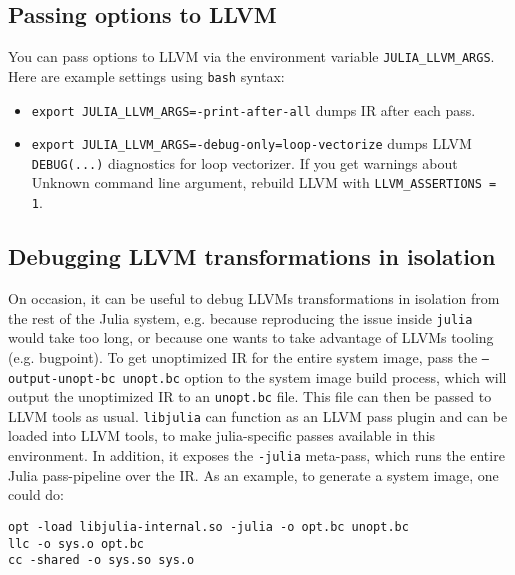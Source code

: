 \hypertarget{3429896864083237221}{}


\subsection{Passing options to LLVM}



You can pass options to LLVM via the environment variable \texttt{JULIA\_LLVM\_ARGS}. Here are example settings using \texttt{bash} syntax:



\begin{itemize}
\item \texttt{export JULIA\_LLVM\_ARGS=-print-after-all} dumps IR after each pass.


\item \texttt{export JULIA\_LLVM\_ARGS=-debug-only=loop-vectorize} dumps LLVM \texttt{DEBUG(...)} diagnostics for loop vectorizer. If you get warnings about {\textquotedbl}Unknown command line argument{\textquotedbl}, rebuild LLVM with \texttt{LLVM\_ASSERTIONS = 1}.

\end{itemize}


\hypertarget{7270369944062365114}{}


\subsection{Debugging LLVM transformations in isolation}



On occasion, it can be useful to debug LLVM{\textquotesingle}s transformations in isolation from the rest of the Julia system, e.g. because reproducing the issue inside \texttt{julia} would take too long, or because one wants to take advantage of LLVM{\textquotesingle}s tooling (e.g. bugpoint). To get unoptimized IR for the entire system image, pass the \texttt{--output-unopt-bc unopt.bc} option to the system image build process, which will output the unoptimized IR to an \texttt{unopt.bc} file. This file can then be passed to LLVM tools as usual. \texttt{libjulia} can function as an LLVM pass plugin and can be loaded into LLVM tools, to make julia-specific passes available in this environment. In addition, it exposes the \texttt{-julia} meta-pass, which runs the entire Julia pass-pipeline over the IR. As an example, to generate a system image, one could do:




\begin{lstlisting}
opt -load libjulia-internal.so -julia -o opt.bc unopt.bc
llc -o sys.o opt.bc
cc -shared -o sys.so sys.o
\end{lstlisting}



